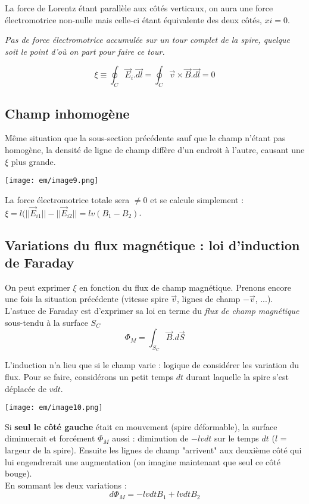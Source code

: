 \documentclass[british,french,11pt, a4paper, openany]{book}
\begin{document}
La force de Lorentz étant parallèle aux côtés verticaux, on aura une force électromotrice non-nulle mais celle-ci étant équivalente des deux côtés, $xi = 0$.
\begin{center}
	\textit{Pas de force électromotrice accumulée sur un tour complet de la spire, quelque soit le point d'où on part pour faire ce tour.}
\end{center}
\begin{equation}
	\xi \equiv \oint_C \vec{E}_i.\vec{dl} = \oint_C \vec{v} \times \vec{B}.\vec{dl} = 0
\end{equation}


\subsection{Champ inhomogène}
Même situation que la sous-section précédente sauf que le champ n'étant pas homogène, la densité de ligne de champ diffère d'un endroit à l'autre, causant une $\xi$ plus grande.
\begin{center}
	\texttt{[image: em/image9.png]}\\
\end{center}
La force électromotrice totale sera $\neq 0$ et se calcule simplement : $\xi = l(||\vec{E}_{i1}|| - ||\vec{E}_{i2}|| = lv(B_1 - B_2)$.\\

\subsection{Variations du flux magnétique : loi d'induction de Faraday}
On peut exprimer $\xi$ en fonction du flux de champ magnétique. Prenons encore une fois la situation précédente (vitesse spire $\vec{v}$, lignes de champ $-\vec{v}$, ...).\\
L'astuce de Faraday est d'exprimer sa loi en terme du \textit{flux de champ magnétique} sous-tendu à la surface $S_C$
\begin{equation}
	\Phi_M = \int_{S_C} \vec{B}.d\vec{S}
\end{equation}

L'induction n'a lieu que si le champ varie : logique de considérer les variation du flux. Pour se faire, considérons un petit temps $dt$ durant laquelle la spire s'est déplacée de $vdt$.

\begin{center}
	\texttt{[image: em/image10.png]}\\
\end{center}
Si \textbf{seul le côté gauche} était en mouvement (spire déformable), la surface diminuerait et forcément $\Phi_M$ aussi : diminution de $-lvdt$ sur le temps $dt$ ($l$ = largeur de la spire). Ensuite les lignes de champ "arrivent" aux deuxième côté qui lui engendrerait une augmentation (on imagine maintenant que seul ce côté bouge). \\
En sommant les deux variations : 
\begin{equation}
	d\Phi_M = -lvdtB_1 + lvdtB_2
\end{equation}
\end{document}
